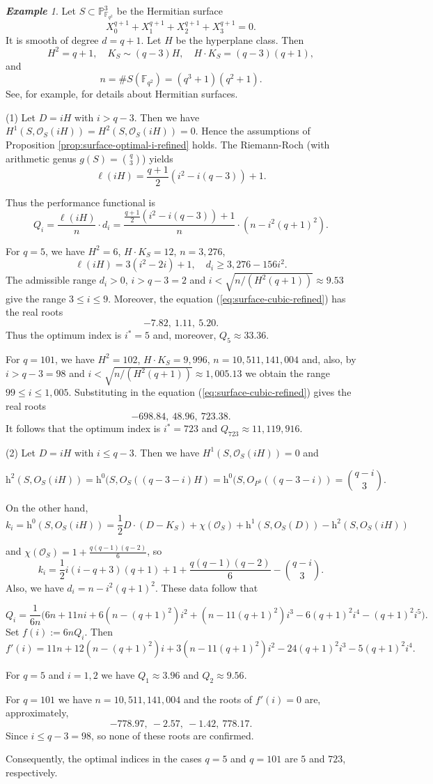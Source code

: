 \documentclass[14pt]{amsart}
\theoremstyle{plain}
\theoremstyle{definition}
\theoremstyle{remark}
\newtheorem{exam}[thm]{\bf Example}
\theoremstyle{example}
\def \h{\mathrm{h}}
\def \P{\mathbb{P}}
\def \F{\mathbb{F}}
\def \O{\mathcal{O}}
\begin{document}
\begin{exam}
Let $S\subset\P^3_{\F_{q^2}}$ be the Hermitian surface
$$X_0^{q+1}+X_1^{q+1}+X_2^{q+1}+X_3^{q+1}=0.$$
It is smooth of degree $d = q+1$.
Let $H$ be the hyperplane class. Then
$$H^2=q+1,\quad K_S\sim (q-3)H,\quad H\cdot K_S=(q-3)(q+1),$$
and
$$n=\#S(\F_{q^2})=(q^3+1)(q^2+1).$$
See, for example, \cite{HoKi} for details about Hermitian surfaces.

(1) Let $D=iH$ with $i>q-3$. Then we have $H^1(S,\O_S(iH))=H^2(S,\O_S(iH))=0$. Hence the assumptions of Proposition \ref{prop:surface-optimal-i-refined} holds. The Riemann-Roch (with arithmetic genus $g(S)=\binom{q}{3}$) yields
$$\ell(iH)=\frac{q+1}{2}\left(i^2-i(q-3)\right)+1.$$

Thus the performance functional is
$$Q_i=\frac{\ell(iH)}{n}\cdot d_i=\frac{\frac{q+1}{2}\left(i^2-i(q-3)\right)+1}{n}\cdot \left(n-i^2(q+1)^2\right).$$


For $q=5$, we have $H^2=6$, $H\cdot K_S =12$, $n=3,276$,
$$\ell(iH)=3(i^2-2i)+1,\quad d_i\geq 3,276-156 i^2.$$
The admissible range $d_i>0$, $i>q-3=2$ and $i<\sqrt{n/(H^2(q+1))}\approx 9.53$ give the range $3\leq i\leq 9$. Moreover, the equation (\ref{eq:surface-cubic-refined}) has the real roots 
$$-7.82,\ 1.11,\ 5.20.$$ 
Thus the optimum index is $i^*=5$ and, moreover, $Q_5\approx 33.36$.

For $q=101$, we have $H^2=102$, $H\cdot K_S =9,996$, $n=10,511,141,004$ and, also, by $i>q-3=98$ and $i<\sqrt{n/(H^2(q+1))}\approx 1,005.13$ we obtain the range $99\leq i\leq 1,005$. Substituting in the equation (\ref{eq:surface-cubic-refined}) gives the real roots $$-698.84,\ 48.96,\ 723.38.$$ It follows that the optimum index is $i^*=723$ and $Q_{723}\approx 11,119,916$.

(2) Let $D=iH$ with $i\leq q-3$. Then we have $H^1(S,\O_S(iH))=0$ and

$$\h^2(S,O_S(iH))=\h^0(S,O_S((q-3-i)H)=\h^0(S,O_{P^3}((q-3-i))=\binom{q-i}{3}.$$

On the other hand, 
$$k_i=\h^0(S,O_S(iH))=\frac{1}{2}D\cdot (D-K_S)+\chi(\O_S)+\h^1(S,O_S(D))-\h^2(S,O_S(iH))$$

and $\chi(\O_S)=1+\frac{q(q-1)(q-2)}{6}$, so
$$k_i=\frac{1}{2}i(i-q+3)(q+1)+1+\frac{q(q-1)(q-2)}{6}-\binom{q-i}{3}.$$
Also, we have $d_i=n-i^2(q+1)^2$. These data follow that

\[
Q_i =\frac{1}{6n}\big( 6n 
+ 11n i
+ 6(n - (q + 1)^2) i^2
+ (n - 11 (q + 1)^2) i^3
- 6(q + 1)^2 i^4
- (q + 1)^2 i^5\big).
\]
Set $f(i):=6nQ_i$. Then 
$$f'(i)=11n+12(n - (q + 1)^2)i+3(n - 11 (q + 1)^2)i^2-24(q + 1)^2 i^3-5(q + 1)^2 i^4.$$

For $q=5$ and $i=1,2$ we have $Q_1\approx 3.96$ and $Q_2\approx 9.56$. %

For $q=101$ we have $n=10,511,141,004$ and the roots of $f'(i)=0$ are, approximately,
$$-778.97,\ -2.57,\ -1.42,\ 778.17.$$
Since $i\leq q-3=98$, so none of these roots are confirmed. 

Consequently, the optimal indices in the cases $q=5$ and $q=101$ are $5$ and $723$, respectively.
\end{exam}
\end{document}
